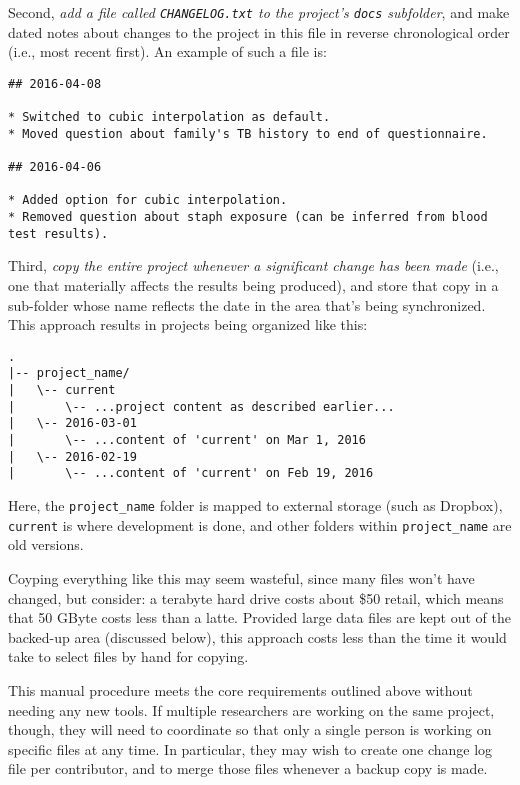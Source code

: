 \documentclass[10pt]{article}
\newcommand{\recommend}[1]{\textit{#1}}
\begin{document}
Second, \recommend{add a file called \texttt{CHANGELOG.txt} to the
  project's \texttt{docs} subfolder}, and make dated notes about
changes to the project in this file in reverse chronological order
(i.e., most recent first). An example of such a file is:

\begin{verbatim}
## 2016-04-08

* Switched to cubic interpolation as default.
* Moved question about family's TB history to end of questionnaire.

## 2016-04-06

* Added option for cubic interpolation.
* Removed question about staph exposure (can be inferred from blood test results).
\end{verbatim}

Third, \recommend{copy the entire project whenever a significant
  change has been made} (i.e., one that materially affects the results
being produced), and store that copy in a sub-folder whose name
reflects the date in the area that's being synchronized. This approach
results in projects being organized like this:

\begin{verbatim}
.
|-- project_name/
|   \-- current
|       \-- ...project content as described earlier...
|   \-- 2016-03-01
|       \-- ...content of 'current' on Mar 1, 2016
|   \-- 2016-02-19
|       \-- ...content of 'current' on Feb 19, 2016
\end{verbatim}

Here, the \texttt{project\_name} folder is mapped to external storage
(such as Dropbox), \texttt{current} is where development is done, and
other folders within \texttt{project\_name} are old versions.

Coyping everything like this may seem wasteful, since many files won't
have changed, but consider: a terabyte hard drive costs about \$50
retail, which means that 50 GByte costs less than a latte. Provided
large data files are kept out of the backed-up area (discussed below),
this approach costs less than the time it would take to select files by
hand for copying.

This manual procedure meets the core requirements outlined above without
needing any new tools. If multiple researchers are working on the same
project, though, they will need to coordinate so that only a single
person is working on specific files at any time. In particular, they may
wish to create one change log file per contributor, and to merge those
files whenever a backup copy is made.
\end{document}
